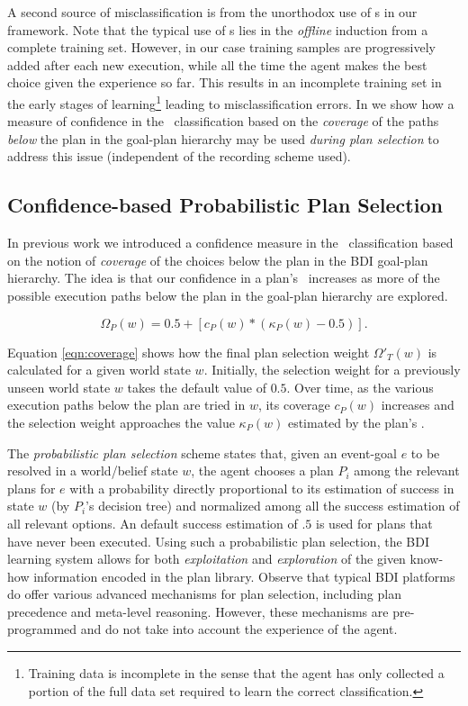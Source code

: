 A second source of misclassification is from the unorthodox use of \dt s in our framework. Note that the typical use of \dt s lies in the \textit{offline} induction from a complete training set. However, in our case training samples are progressively added after each new execution, while all the time the agent makes the best choice given the experience so far. This results in an incomplete training set in the early stages of learning\footnote{Training data is incomplete in the sense that the agent has only collected a portion of the full data set required to learn the correct classification.} leading to misclassification errors. In \cite{Singh:AAMAS10} we show how a measure of confidence in the \dt\ classification based on the \textit{coverage} of the paths \textit{below} the plan in the goal-plan hierarchy may be used \textit{during plan selection} to address this issue (independent of the recording scheme used).


\subsection{Confidence-based Probabilistic Plan Selection}

In previous work \cite{Singh:AAMAS10} we introduced a confidence measure in the \dt\ classification based on the notion of \textit{coverage} of the choices below the plan in the BDI goal-plan hierarchy. The idea is that our confidence in a plan's \dt\ increases as more of the possible execution paths below the plan in the goal-plan hierarchy are explored.

\begin{equation*}\label{eqn:coverage}   
\Omega_P(w) = 0.5 + \left[  c_P(w) *  \left( \kappa_P(w) - 0.5 \right)  \right].
\end{equation*}

Equation \ref{eqn:coverage} shows how the final plan selection weight $\Omega'_T(w)$ is calculated for a given world state $w$. Initially, the selection weight for a previously unseen world state $w$ takes the default value of $0.5$. Over time, as the various execution paths below the plan are tried in $w$, its coverage $c_P(w)$ increases and the selection weight approaches the value $\kappa_P(w)$ estimated by the plan's \dt.

The \emph{probabilistic plan selection} scheme states that, given an event-goal
$e$ to be resolved in a world/belief state $w$, the agent chooses a plan $P_i$
among the relevant plans for $e$ with a probability directly proportional to its
estimation of success in state $w$ (by $P_i$'s decision tree) and normalized
among all the success estimation of all relevant options. An default success
estimation of $.5$ is used for plans that have never been executed.
Using such a probabilistic plan selection, the BDI learning system allows for both
\emph{exploitation} and \emph{exploration} of the given know-how information
encoded in the plan library.
Observe that typical BDI platforms do offer various advanced mechanisms for plan
selection, including plan precedence and meta-level reasoning. However, these
mechanisms are pre-programmed and do not take into account the experience of the
agent.




